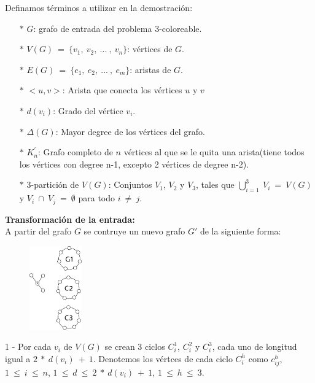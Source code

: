 \documentclass{article}
\begin{document}
Definamos t\'erminos a utilizar en la demostraci\'on: 
\begin{itemize}
    \item[$\ast $] $G$: grafo de entrada del problema 3-coloreable.
    \item[$\ast $] $V(G)~ = ~\{v_1,~ v_2,~ ... ~, ~v_n\}$: v\'ertices de $G$.
    \item[$\ast $] $E(G)~ = ~\{e_1, ~e_2,~ ...~ ,~ e_m\}$: aristas de $G$.
    \item[$\ast $] $<u,v>$: Arista que conecta los v\'ertices $u$ y $v$
    \item[$\ast $] $d(v_i)$: Grado del v\'ertice $v_i$.
    \item[$\ast $] $\Delta(G)$: Mayor degree de los v\'ertices del grafo.
    \item[$\ast $] $K^{'}_n$: Grafo completo de $n$ v\'ertices al que se le quita una arista(tiene todos los v\'ertices con degree n-1, excepto 2 v\'ertices de degree n-2).
    \item[$\ast $] $3$-partici\'on de $V(G)$: Conjuntos $V_1$, $V_2$ y $V_3$, tales que $\bigcup_{i=1}^{3} ~V_i~ = ~V(G)$  y $V_i ~\cap~ V_j~ =~ \emptyset$ para todo $i~ \neq~ j$.
\end{itemize}

\textbf{Transformaci\'on de la entrada:}\\

A partir del grafo $G$ se contruye un nuevo grafo $G'$ de la siguiente forma:\\ 

\begin{figure}
    \centering
    \includegraphics[width= 0.2\textwidth]{img1.png}
\end{figure}

1 - Por cada $v_i$ de $V(G)$ se crean $3$ ciclos $C_i^1$, $C_i^2$ y $C_i^3$, cada uno de longitud igual a $2 ~*~ d(v_i)~ + ~1$. Denotemos 
los v\'ertces de cada ciclo $C_i^h$ como $c_{ij}^h$, $1~ \leq~i~\leq ~n$, $1~ \leq~d~\leq ~2 ~*~ d(v_i)~ + ~1$, $1~ \leq~h~\leq ~3$.\\ 
\end{document}

